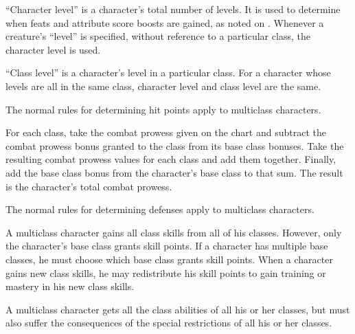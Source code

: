         ``Character level'' is a character's total number of levels.
        It is used to determine when feats and attribute score boosts are gained, as noted on .
        Whenever a creature's ``level'' is specified, without reference to a particular class, the character level is used.

        \par ``Class level'' is a character's level in a particular class.
        For a character whose levels are all in the same class, character level and class level are the same.

        The normal rules for determining hit points apply to multiclass characters.

        For each class, take the combat prowess given on the chart and subtract the combat prowess bonus granted to the class from its base class bonuses.
        Take the resulting combat prowess values for each class and add them together.
        Finally, add the base class bonus from the character's base class to that sum.
        The result is the character's total combat prowess.

        The normal rules for determining defenses apply to multiclass characters.

        A multiclass character gains all class skills from all of his classes.
        However, only the character's base class grants skill points.
        If a character has multiple base classes, he must choose which base class grants skill points.
        When a character gains new class skills, he may redistribute his skill points to gain training or mastery in his new class skills.

        A multiclass character gets all the class abilities of all his or her classes, but must also suffer the consequences of the special restrictions of all his or her classes.

